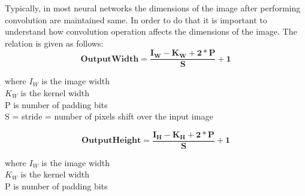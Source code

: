 \documentclass{IEEEtran}
\begin{document}
Typically, in most neural networks the dimensions of the image after performing convolution are maintained same. In order to do that it is important to understand how convolution operation affects the dimensions of the image. The relation is given as follows:
\begin{equation*}
	\boldsymbol{Output Width = \frac{I_W - K_W + 2*P}{S} + 1}
\end{equation*}
\begin{center}
where  $I_W$ is the image width \\
$K_W$ is the kernel width	\\	
P is number of padding bits	\\
S = stride = number of pixels shift over the input image
\end{center}
\begin{equation*}
	\boldsymbol{Output Height = \frac{I_H - K_H + 2*P}{S} + 1}
\end{equation*}
\begin{center}
where  $I_W$ is the image width \\
$K_W$ is the kernel width	\\	
P is number of padding bits
\end{center}
\end{document}

